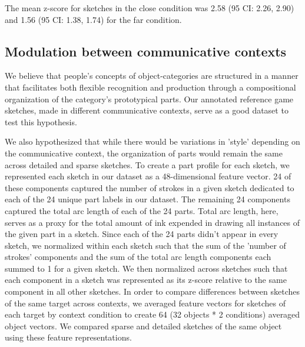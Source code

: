\documentclass[10pt,letterpaper]{article}
\newcommand{\jefan}[1]{{\color{blue}{[jefan: #1]}}}
\begin{document}
 The mean z-score for sketches in the close condition was 2.58 (95 CI: 2.26, 2.90) and 1.56 (95 CI: 1.38, 1.74) for the far condition.




\subsection{Modulation between communicative contexts}
\jefan{where we would report analysis of the sketch part features (num strokes, arc length)
e.g., when the far sketches are more abstract, how does that manifest in this feature representation?
like, are they more similar to each other, more like "bird" and lacking object-specific details?
a way of measuring this is that the centroid (euclidean norm, magnitude of the vector) is closer to the origin for far vs. close, and also that the RMSD to centroid of far sketches is smaller than for close sketches.... }

We believe that people's concepts of object-categories are structured in a manner that facilitates both flexible recognition and production through a compositional organization of the category's prototypical parts. Our annotated reference game sketches, made in different communicative contexts, serve as a good dataset to test this hypothesis.

We also hypothesized that while there would be variations in 'style' depending on the communicative context, the organization of parts would remain the same across detailed and sparse sketches. To create a part profile for each sketch, we represented each sketch in our dataset as a 48-dimensional feature vector. 
24 of these components captured the number of strokes in a given sketch dedicated to each of the 24 unique part labels in our dataset. The remaining 24 components captured the total arc length of each of the 24 parts. Total arc length, here, serves as a proxy for the total amount of ink expended in drawing all instances of the given part in a sketch. Since each of the 24 parts didn't appear in every sketch, we normalized within each sketch such that the sum of the 'number of strokes' components and the sum of the total arc length components each summed to 1 for a given sketch. We then normalized across sketches such that each component in a sketch was represented as its z-score relative to the same component in all other sketches. 
In order to compare differences between sketches of the same target across contexts, we averaged feature vectors for sketches of each target by context condition to create 64 (32 objects * 2 conditions) averaged object vectors.
We compared sparse and detailed sketches of the same object using these feature representations. 
\end{document}

